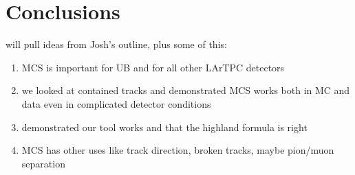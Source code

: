\section{Conclusions}
will pull ideas from Josh's outline, plus some of this:
\begin{enumerate}
\item MCS is important for UB and for all other LArTPC detectors
\item we looked at contained tracks and demonstrated MCS works both in MC and data even in complicated detector conditions
\item demonstrated our tool works and that the highland formula is right
\item MCS has other uses like track direction, broken tracks, maybe pion/muon separation
\end{enumerate}